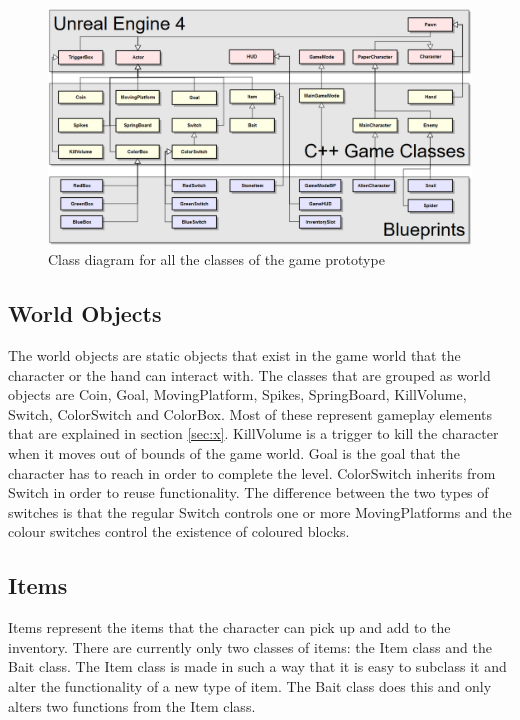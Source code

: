 \begin{figure}
	\includegraphics[width=\textwidth]{images/class_diagram_full}
	\caption{Class diagram for all the classes of the game prototype}
	\label{fig:class_diagram_full}
\end{figure}

\subsection{World Objects}
The world objects are static objects that exist in the game world that the character or the hand can interact with. The classes that are grouped as world objects are Coin, Goal, MovingPlatform, Spikes, SpringBoard, KillVolume, Switch, ColorSwitch and ColorBox. Most of these represent gameplay elements that are explained in section \ref{sec:x}. KillVolume is a trigger to kill the character when it moves out of bounds of the game world. Goal is the goal that the character has to reach in order to complete the level. ColorSwitch inherits from Switch in order to reuse functionality. The difference between the two types of switches is that the regular Switch controls one or more MovingPlatforms and the colour switches control the existence of coloured blocks.

\subsection{Items}
Items represent the items that the character can pick up and add to the inventory. There are currently only two classes of items: the Item class and the Bait class. The Item class is made in such a way that it is easy to subclass it and alter the functionality of a new type of item. The Bait class does this and only alters two functions from the Item class.

